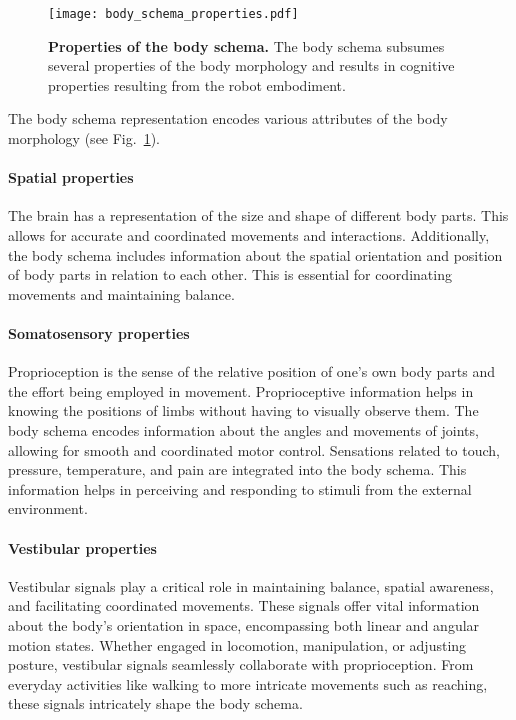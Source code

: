
\begin{figure}
	\begin{center}
		\texttt{[image: body\_schema\_properties.pdf]}
		\caption{\textbf{Properties of the body schema.} The body schema subsumes several properties of the body morphology and results in cognitive properties resulting from the robot embodiment.}
		\label{fig:body_schema_properties}
	\end{center}
\end{figure}

The body schema representation encodes various attributes of the body morphology (see Fig.~\ref{fig:body_schema_properties}). %

\paragraph*{Spatial properties} The brain has a representation of the size and shape of different body parts. This allows for accurate and coordinated movements and interactions. Additionally, the body schema includes information about the spatial orientation and position of body parts in relation to each other. This is essential for coordinating movements and maintaining balance.

\paragraph*{Somatosensory properties} Proprioception is the sense of the relative position of one's own body parts and the effort being employed in movement. Proprioceptive information helps in knowing the positions of limbs without having to visually observe them. The body schema encodes information about the angles and movements of joints, allowing for smooth and coordinated motor control. Sensations related to touch, pressure, temperature, and pain are integrated into the body schema. This information helps in perceiving and responding to stimuli from the external environment.

\paragraph*{Vestibular properties} Vestibular signals play a critical role in maintaining balance, spatial awareness, and facilitating coordinated movements. These signals offer vital information about the body's orientation in space, encompassing both linear and angular motion states. Whether engaged in locomotion, manipulation, or adjusting posture, vestibular signals seamlessly collaborate with proprioception. From everyday activities like walking to more intricate movements such as reaching, these signals intricately shape the body schema.

